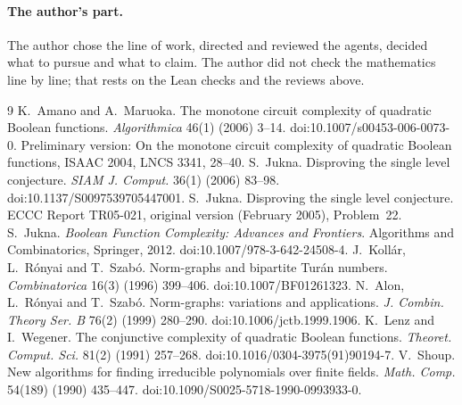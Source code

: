 \documentclass[11pt]{article}
\theoremstyle{definition}
\theoremstyle{remark}
\begin{document}
\paragraph{The author's part.} The author chose the line of work, directed and reviewed the agents, decided what to
pursue and what to claim. The author did not check the mathematics line by line; that rests on the Lean checks and the
reviews above.


\begin{thebibliography}{9}
 K.~Amano and A.~Maruoka. The monotone circuit complexity of quadratic Boolean functions.
\emph{Algorithmica} 46(1) (2006) 3--14. doi:10.1007/s00453-006-0073-0. Preliminary version: On the monotone circuit
complexity of quadratic Boolean functions, ISAAC 2004, LNCS 3341, 28--40.
 S.~Jukna. Disproving the single level conjecture. \emph{SIAM J. Comput.} 36(1) (2006) 83--98.
doi:10.1137/S0097539705447001.
 S.~Jukna. Disproving the single level conjecture. ECCC Report TR05-021, original version (February
2005), Problem~22.
 S.~Jukna. \emph{Boolean Function Complexity: Advances and Frontiers}. Algorithms and Combinatorics,
Springer, 2012. doi:10.1007/978-3-642-24508-4.
 J.~Koll\'ar, L.~R\'onyai and T.~Szab\'o. Norm-graphs and bipartite Tur\'an numbers.
\emph{Combinatorica} 16(3) (1996) 399--406. doi:10.1007/BF01261323.
 N.~Alon, L.~R\'onyai and T.~Szab\'o. Norm-graphs: variations and applications.
\emph{J. Combin. Theory Ser. B} 76(2) (1999) 280--290. doi:10.1006/jctb.1999.1906.
 K.~Lenz and I.~Wegener. The conjunctive complexity of quadratic Boolean functions.
\emph{Theoret. Comput. Sci.} 81(2) (1991) 257--268. doi:10.1016/0304-3975(91)90194-7.
 V.~Shoup. New algorithms for finding irreducible polynomials over finite fields. \emph{Math. Comp.}
54(189) (1990) 435--447. doi:10.1090/S0025-5718-1990-0993933-0.
\end{thebibliography}
\end{document}
